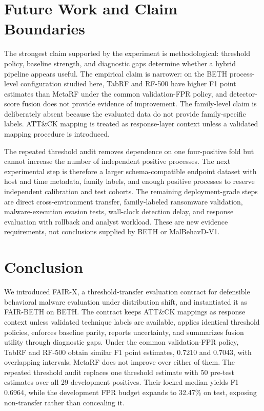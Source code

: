 \documentclass[10pt,journal,compsoc]{IEEEtran}
\begin{document}
\section{Future Work and Claim Boundaries}
\label{sec:recommendations}

The strongest claim supported by the experiment is methodological: threshold policy, baseline strength, and diagnostic gaps determine whether a hybrid pipeline appears useful. The empirical claim is narrower: on the BETH process-level configuration studied here, TabRF and RF-500 have higher F1 point estimates than MetaRF under the common validation-FPR policy, and detector-score fusion does not provide evidence of improvement. The family-level claim is deliberately absent because the evaluated data do not provide family-specific labels. ATT\&CK mapping is treated as response-layer context unless a validated mapping procedure is introduced.

The repeated threshold audit removes dependence on one four-positive fold but cannot increase the number of independent positive processes. The next experimental step is therefore a larger schema-compatible endpoint dataset with host and time metadata, family labels, and enough positive processes to reserve independent calibration and test cohorts. The remaining deployment-grade steps are direct cross-environment transfer, family-labeled ransomware validation, malware-execution evasion tests, wall-clock detection delay, and response evaluation with rollback and analyst workload. These are new evidence requirements, not conclusions supplied by BETH or MalBehavD-V1.

\section{Conclusion}
\label{sec:conclusion}

We introduced FAIR-X, a threshold-transfer evaluation contract for defensible behavioral malware evaluation under distribution shift, and instantiated it as FAIR-BETH on BETH. The contract keeps ATT\&CK mappings as response context unless validated technique labels are available, applies identical threshold policies, enforces baseline parity, reports uncertainty, and summarizes fusion utility through diagnostic gaps. Under the common validation-FPR policy, TabRF and RF-500 obtain similar F1 point estimates, 0.7210 and 0.7043, with overlapping intervals; MetaRF does not improve over either of them. The repeated threshold audit replaces one threshold estimate with 50 pre-test estimates over all 29 development positives. Their locked median yields F1 0.6964, while the development FPR budget expands to 32.47\% on test, exposing non-transfer rather than concealing it.
\end{document}
